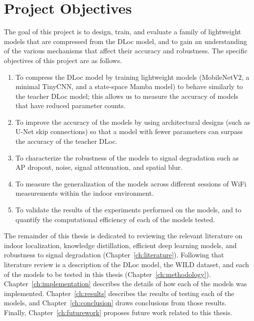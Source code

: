 \section{Project Objectives}
\label{sec:intro:objectives}

The goal of this project is to design, train, and evaluate a family of lightweight models that are
compressed from the DLoc model, and to gain an understanding of the various mechanisms that affect their
accuracy and robustness. The specific objectives of this project are as follows.

\begin{enumerate}[leftmargin=2em]
  \item To compress the DLoc model by training lightweight models (MobileNetV2, a minimal TinyCNN, and a
  state-space Mamba model) to behave similarly to the teacher DLoc model; this allows us to measure the
  accuracy of models that have reduced parameter counts.

  \item To improve the accuracy of the models by using architectural designs (such as U-Net skip
  connections) so that a model with fewer parameters can surpass the accuracy of the teacher DLoc.

  \item To characterize the robustness of the models to signal degradation such as AP dropout, noise,
  signal attenuation, and spatial blur.

  \item To measure the generalization of the models across different sessions of WiFi measurements
  within the indoor environment.

  \item To validate the results of the experiments performed on the models, and to quantify the
  computational efficiency of each of the models tested.
\end{enumerate}

The remainder of this thesis is dedicated to reviewing the relevant literature on indoor localization,
knowledge distillation, efficient deep learning models, and robustness to signal degradation
(Chapter~\ref{ch:literature}). Following that literature review is a description of the DLoc model, the
WILD dataset, and each of the models to be tested in this thesis (Chapter~\ref{ch:methodology}).
Chapter~\ref{ch:implementation} describes the details of how each of the models was implemented.
Chapter~\ref{ch:results} describes the results of testing each of the models, and
Chapter~\ref{ch:conclusion} draws conclusions from those results. Finally,
Chapter~\ref{ch:futurework} proposes future work related to this thesis.
